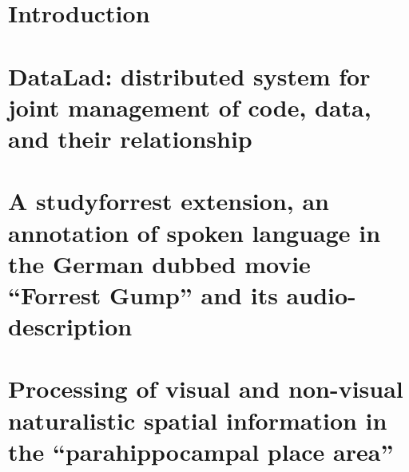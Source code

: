 \documentclass[english,12pt]{report}
\begin{document}
\begin{spacing}{1.5}
\renewcommand{\baselinestretch}{1}\normalsize




\tableofcontents












\chapter{Introduction}
\setcounter{page}{1}







\chapter{DataLad: distributed system for joint management of code, data, and
their relationship}






\chapter{A studyforrest extension, an annotation of spoken language in the
German dubbed movie ``Forrest Gump'' and its audio-description}






\chapter{Processing of visual and non-visual naturalistic spatial information in
the ``parahippocampal place area''}







\end{spacing}
\end{document}
